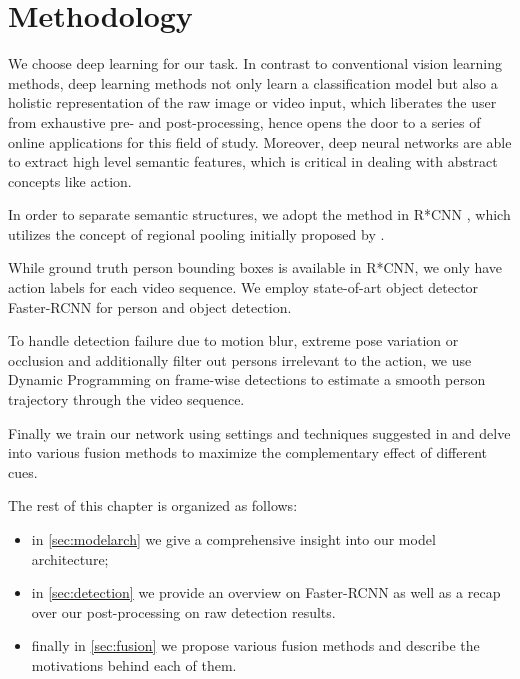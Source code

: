 
\chapter{Methodology}
\label{chap:model}
We choose deep learning for our task. In contrast to conventional vision learning methods, deep learning methods not only learn a classification model but also a holistic representation of the raw image or video input, which liberates the user from exhaustive pre- and post-processing, hence opens the door to a series of online applications for this field of study. 
Moreover, deep neural networks are able to extract high level semantic features, which is critical in dealing with abstract concepts like action. 

In order to separate semantic structures, we adopt the method in R*CNN \cite{gkioxari2015contextual}, which utilizes the concept of regional pooling initially proposed by \cite{girshick2015fast}.

While ground truth person bounding boxes is available in R*CNN, we only have action labels for each video sequence. We employ state-of-art object detector Faster-RCNN \cite{ren2015faster} for person and object detection.

To handle detection failure due to motion blur, extreme pose variation or occlusion and additionally filter out persons irrelevant to the action, we use Dynamic Programming on frame-wise detections to estimate a smooth person trajectory through the video sequence.

Finally we train our network using settings and techniques suggested in \cite{wang2015towards} and delve into various fusion methods to maximize the complementary effect of different cues.

The rest of this chapter is organized as follows: 
\begin{itemize}
\item in \autoref{sec:modelarch} we give a comprehensive insight into our model architecture;
\item in \autoref{sec:detection} we provide an overview on Faster-RCNN as well as a recap over our post-processing on raw detection results.
\item finally in \autoref{sec:fusion} we propose various fusion methods and describe the motivations behind each of them.
\end{itemize}
 

